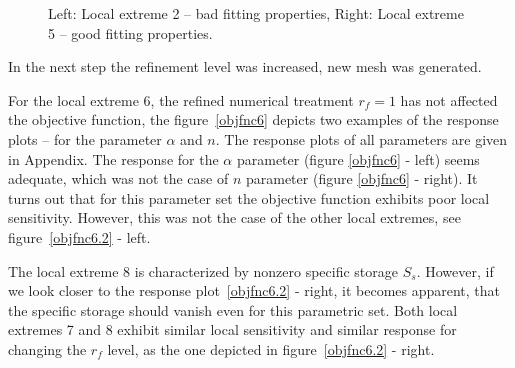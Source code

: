 \documentclass[review,times,3p,10pt]{elsarticle}
\begin{document}
\begin{figure}
\caption{Left: Local extreme 2 -- bad fitting properties, Right: Local extreme 5 -- good fitting properties.}
\label{rf0samples}
\end{figure}

In the next step the refinement level was increased, new mesh was generated.

For the local extreme 6, the refined numerical treatment $r_f=1$ has not affected the objective function, the figure~\ref{objfnc6} depicts two examples of the response plots -- for the parameter $\alpha$ and $n$. The response plots of all parameters are given in Appendix. The response for the $\alpha$ parameter (figure \ref{objfnc6} - left) seems adequate, which was not the case of $n$ parameter  (figure \ref{objfnc6} - right). It turns out that for this parameter set the objective function exhibits poor local sensitivity. However, this was not the case of the other local extremes, see figure~\ref{objfnc6.2} - left. 

The local extreme 8 is characterized by nonzero specific storage $S_s$. However, if we look closer to the response plot~\ref{objfnc6.2} - right, it becomes apparent, that the specific storage should vanish even for this parametric set. Both local extremes 7 and 8 exhibit similar local sensitivity and similar response for changing the $r_f$ level, as the one depicted in figure~\ref{objfnc6.2} - right.
\end{document}

